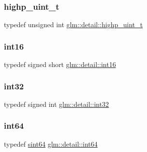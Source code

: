 \mbox{\label{namespaceglm_1_1detail_a994c05c8a976cc902a7cd193ad36bbba}} 
\subsubsection{\texorpdfstring{highp\+\_\+uint\+\_\+t}{highp\_uint\_t}}
{\footnotesize\ttfamily typedef unsigned int \mbox{\hyperlink{namespaceglm_1_1detail_a994c05c8a976cc902a7cd193ad36bbba}{glm\+::detail\+::highp\+\_\+uint\+\_\+t}}}

\mbox{\label{namespaceglm_1_1detail_a375938874ca4f0a0982ec6373b56117b}} 
\subsubsection{\texorpdfstring{int16}{int16}}
{\footnotesize\ttfamily typedef signed short \mbox{\hyperlink{namespaceglm_1_1detail_a375938874ca4f0a0982ec6373b56117b}{glm\+::detail\+::int16}}}

\mbox{\label{namespaceglm_1_1detail_a9f85b4efeca416cdcec2fd08939a2e17}} 
\subsubsection{\texorpdfstring{int32}{int32}}
{\footnotesize\ttfamily typedef signed int \mbox{\hyperlink{namespaceglm_1_1detail_a9f85b4efeca416cdcec2fd08939a2e17}{glm\+::detail\+::int32}}}

\mbox{\label{namespaceglm_1_1detail_a5b1c3227ec636c24a0676746381adfc8}} 
\subsubsection{\texorpdfstring{int64}{int64}}
{\footnotesize\ttfamily typedef \mbox{\hyperlink{namespaceglm_1_1detail_aa9fd5478f3e347aa0b2d1a8bf3408544}{sint64}} \mbox{\hyperlink{namespaceglm_1_1detail_a5b1c3227ec636c24a0676746381adfc8}{glm\+::detail\+::int64}}}

